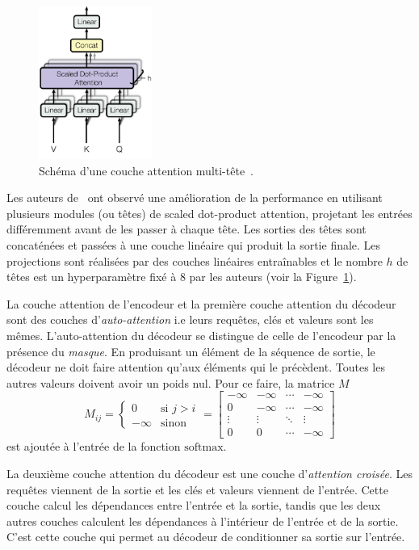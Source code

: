 \begin{figure}[hbt]
    \centering
    \includegraphics[height=5cm]{assets/images/multihead-attention.png}
    \caption[Schéma d'une couche attention multitête.]
    {Schéma d'une couche attention multi-tête~\cite[Fig 2]{attention}.}
    \label{fig.multihead-attention}
\end{figure}

Les auteurs de~\cite{attention} ont observé une amélioration de la performance 
en utilisant plusieurs modules (ou têtes) de \foreignlanguage{english}{scaled dot-product attention},
projetant les entrées différemment avant de les passer à chaque tête.
Les sorties des têtes sont concaténées et passées à une couche linéaire qui produit la sortie finale.
Les projections sont réalisées par des couches linéaires entraînables et le nombre \(h\) de têtes est un hyperparamètre fixé à \(8\) par les auteurs%
(voir la Figure~\ref{fig.multihead-attention}).

La couche attention de l'encodeur et la première couche attention du décodeur sont des couches
d'\emph{auto-attention} i.e leurs requêtes, clés et valeurs sont les mêmes.
L'auto-attention du décodeur se distingue de celle de l'encodeur par la présence du \emph{masque}.
En produisant un élément de la séquence de sortie, le décodeur ne doit faire attention qu'aux éléments
qui le précèdent.
Toutes les autres valeurs doivent avoir un poids nul.
Pour ce faire, la matrice \(M\) 
\begin{equation}
    M_{ij} = \begin{cases}
        0 & \text{si } j > i \\
        -\infty & \text{sinon}
    \end{cases} 
    = \begin{bmatrix}
        -\infty & -\infty & \cdots & -\infty \\
        0       & -\infty & \cdots & -\infty \\
        \vdots  & \vdots  & \ddots & \vdots \\
        0       & 0       & \cdots & -\infty
    \end{bmatrix}
\end{equation}
est ajoutée à l'entrée de la fonction \(\text{softmax}\).

La deuxième couche attention du décodeur est une couche d'\emph{attention croisée}.
Les requêtes viennent de la sortie et les clés et valeurs viennent de l'entrée.
Cette couche calcul les dépendances entre l'entrée et la sortie,
tandis que les deux autres couches calculent les dépendances à l'intérieur de l'entrée et de la sortie.
C'est cette couche qui permet au décodeur de conditionner sa sortie sur l'entrée.


